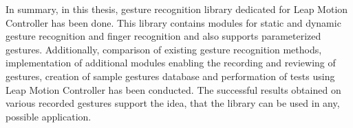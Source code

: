 In summary, in this thesis, gesture recognition library dedicated for Leap Motion Controller has been done. This library contains modules for static and dynamic gesture recognition and finger recognition and also supports parameterized gestures. Additionally, comparison of existing gesture recognition methods, implementation of additional modules enabling the recording and reviewing of gestures, creation of sample gestures database and performation of tests using Leap Motion Controller has been conducted. The successful results obtained on various recorded gestures support the idea, that the library can be used in any, possible application. 

